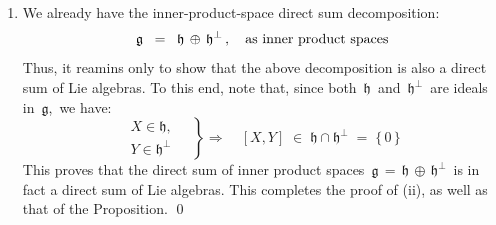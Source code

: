 \begin{enumerate}
    \vskip 0.3cm
    \noindent
    \textbf{Claim 2:}\;\; 
    $\mathfrak{h}^{\perp} \,\subset\, \mathfrak{g}$\,
    is an \,$(\ad\vert_{\mathfrak{k}})$-invariant subspace.
    \vskip 0.05cm
    Proof of Claim 2:\;\;
    This is an immediate consequence of Proposition 4.27, p.92, \cite{Hall2015},
    which states that a ``unitary'' representation of a real Lie algebra
    on a finite-dimensional inner product space is completely reducible.
    This proves Claim 2.

    \vskip 0.3cm
    \noindent
    \textbf{Claim 3:}\;\; 
    $\mathfrak{h}^{\perp} \,\subset\, \mathfrak{g}$\,
    is an \,$(\ad)$-invariant subspace;
    equivalently,
    \,$\mathfrak{h}^{\perp} \,\subset\, \mathfrak{g}$\,
    is an ideal in \,$\mathfrak{g}$.\,
    \vskip 0.05cm
    Proof of Claim 3:\;\;
    Immediate by Claim 2 and $\C$-linearity of
    \,$\ad\vert_{\mathfrak{k}} : \mathfrak{k} \longrightarrow \gl(\,\mathfrak{g}\,)$:
    \begin{equation*}
    \ad_{(X_{1}+\i X_{2})}(Q)
    \; = \;
        \ad_{X_{1}}(Q)
        \, + \,
        \i\,\ad_{X_{2}}(Q)
    \; \in \;
        \mathfrak{h}^{\perp} + \i\,\mathfrak{h}^{\perp}
    \; = \;
        \mathfrak{h}^{\perp}\,,
    \;\;
    \textnormal{for each \,$X_{1},X_{2}\in\mathfrak{k}$,\, $Q \in \mathfrak{h}^{\perp}$}
    \end{equation*}
    This completes the proof of (i).
\item
    We already have the inner-product-space direct sum decomposition:
    \begin{equation*}
    \mathfrak{g}
    \;\; = \;\;
        \mathfrak{h} \,\oplus\, \mathfrak{h}^{\perp}\,,
    \quad
    \textnormal{as inner product spaces}
    \end{equation*}
    Thus, it reamins only to show that the above decomposition
    is also a direct sum of Lie algebras.
    To this end, note that, since both \,$\mathfrak{h}$\, and \,$\mathfrak{h}^{\perp}$\,
    are ideals in \,$\mathfrak{g}$,\, we have:
    \begin{equation*}
    \left.\begin{array}{l}
        X \in \mathfrak{h},
        \\
        Y \in \mathfrak{h}^{\perp}
        \end{array}\quad\right\}
    \!\Longrightarrow\quad
    [X,Y] \;\in\; \mathfrak{h} \cap \mathfrak{h}^{\perp} \;=\; \{\,0\,\} 
    \end{equation*}
    This proves that the direct sum of inner product spaces
    \,$\mathfrak{g} \,=\, \mathfrak{h} \,\oplus\, \mathfrak{h}^{\perp}$\,
    is in fact a direct sum of Lie algebras.
    \vskip 0.3cm
    This completes the proof of (ii), as well as that of the Proposition.
    \qed
\end{enumerate}

